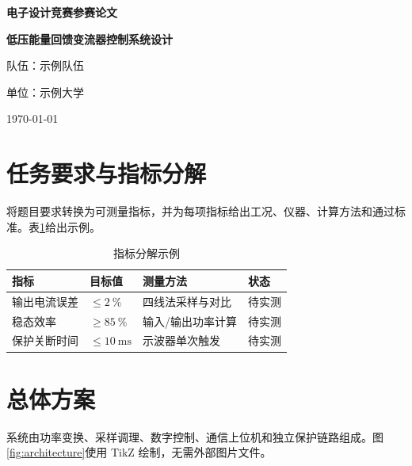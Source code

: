 \documentclass[UTF8,a4paper,12pt,fontset=fandol]{ctexart}
\newcommand{\ProjectTitle}{低压能量回馈变流器控制系统设计}
\newcommand{\TeamName}{示例队伍}
\newcommand{\University}{示例大学}
\newcommand{\Competition}{电子设计竞赛}
\begin{document}
\begin{titlepage}
  \centering
  {\bfseries \Competition 参赛论文\par}
  \vspace{2.2cm}
  {\bfseries \ProjectTitle\par}
  \vspace{1.5cm}
  {队伍：\TeamName\par}
  {单位：\University\par}
  \vfill
  {\today\par}
\end{titlepage}

\begin{abstract}
本文给出一套面向低压、隔离实验平台的能量回馈变流器控制系统设计示例。论文结构覆盖需求拆解、总体方案、硬件与软件设计、控制算法、保护策略、测试方法、结果分析和成本评估。示例数据仅用于演示排版，参赛时必须替换为真实测量结果。

\textbf{关键词：} 能量回馈；变流器；嵌入式控制；故障保护；实验验证
\end{abstract}

\tableofcontents
\newpage

\section{任务要求与指标分解}
将题目要求转换为可测量指标，并为每项指标给出工况、仪器、计算方法和通过标准。表\ref{tab:requirements}给出示例。

\begin{table}[htbp]
\centering
\caption{指标分解示例}
\label{tab:requirements}
\begin{tabular}{llll}
\toprule
指标 & 目标值 & 测量方法 & 状态 \\
\midrule
输出电流误差 & $\leq\SI{2}{\percent}$ & 四线法采样与对比 & 待实测 \\
稳态效率 & $\geq\SI{85}{\percent}$ & 输入/输出功率计算 & 待实测 \\
保护关断时间 & $\leq\SI{10}{\milli\second}$ & 示波器单次触发 & 待实测 \\
\bottomrule
\end{tabular}
\end{table}

\section{总体方案}
系统由功率变换、采样调理、数字控制、通信上位机和独立保护链路组成。图\ref{fig:architecture}使用 TikZ 绘制，无需外部图片文件。
\end{document}
